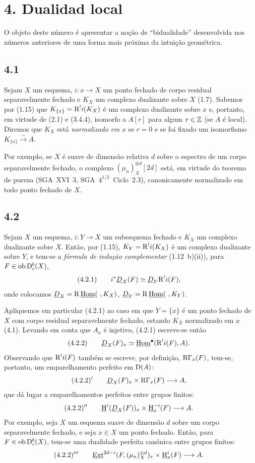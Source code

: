 \section*{4. Dualidad local}

O objeto deste número é apresentar a noção de ``bidualidade'' desenvolvida nos números anteriores de uma forma mais próxima da intuição geométrica.

\subsection*{4.1}
Sejam $X$ um esquema, $i : x \to X$ um ponto fechado de corpo residual separavelmente fechado e $K_X$ um complexo dualizante sobre $X$ (1.7). Sabemos por (1.15) que $K_{\{x\}} = \mathrm{R}^{!}i(K_X)$ é um complexo dualizante sobre $x$ e, portanto, em virtude de (2.1) e (3.4.4), isomorfo a $A[r]$ para algum $r \in \mathbb{Z}$ (se $A$ é local). Diremos que $K_X$ está \emph{normalizado em $x$} se $r = 0$ e se foi fixado um isomorfismo $K_{\{x\}} \xrightarrow{\sim} A$.

Por exemplo, se $X$ é suave de dimensão relativa $d$ sobre o espectro de um corpo separavelmente fechado, o complexo $(\mu_n)_X^{\otimes d}[2d]$ está, em virtude do teorema de pureza (SGA~XVI~3, SGA~$4^{1/2}$~Ciclo~2.3), canonicamente normalizado em todo ponto fechado de $X$.

\subsection*{4.2}
Sejam $X$ um esquema, $i : Y \to X$ um subesquema fechado e $K_X$ um complexo dualizante sobre $X$. Então, por (1.15), $K_Y = \mathrm{R}^{!}i(K_X)$ é um complexo dualizante sobre $Y$, e tem-se a \emph{fórmula de indução complementar} (1.12~b)(ii)), para $F \in \operatorname{ob} \mathrm{D}_c^b(X)$,
\[
(4.2.1)\qquad i^*\underline{D}_X(F)\simeq\underline{D}_Y\mathrm{R}^{!}i(F),
\]
onde colocamos $\underline{D}_X = \mathrm{R}\,\underline{\operatorname{Hom}}(\ ,K_X)$, $\underline{D}_Y = \R\,\underline{\Hom}(\ ,K_Y)$.

Apliquemos em particular (4.2.1) ao caso em que $Y = \{x\}$ é um ponto fechado de $X$ com corpo residual separavelmente fechado, estando $K_X$ normalizado em $x$ (4.1). Levando em conta que $A_x$ é injetivo, (4.2.1) escreve-se então
\[
(4.2.2)\qquad \underline{D}_X(F)_x\simeq\underline{\operatorname{Hom}}^{\bullet}(\mathrm{R}^{!}i(F),A).
\]
Observando que $\mathrm{R}^{!}i(F)$ também se escreve, por definição, $\mathrm{R}\Gamma_x(F)$, tem-se, portanto, um emparelhamento perfeito em $\mathrm{D}(A)$:
\[
(4.2.2)'\qquad \underline{D}_X(F)_x\times \mathrm{R}\Gamma_x(F)\longrightarrow A,
\]
que dá lugar a emparelhamentos perfeitos entre grupos finitos:
\[
(4.2.2)''\qquad \underline{\mathrm H}^i(\underline{D}_X(F))_x\times \underline{\mathrm H}_x^{-i}(F)\longrightarrow A.
\]
Por exemplo, seja $X$ um esquema suave de dimensão $d$ sobre um corpo separavelmente fechado, e seja $x \in X$ um ponto fechado. Então, para $F \in \operatorname{ob} \mathrm{D}_c^b(X)$, tem-se uma dualidade perfeita canônica entre grupos finitos:
\[
(4.2.2)'''\qquad \underline{\operatorname{Ext}}^{2d-i}(F,(\mu_n)_X^{\otimes d})_x\times \underline{\mathrm H}_x^i(F)\longrightarrow A.
\]

